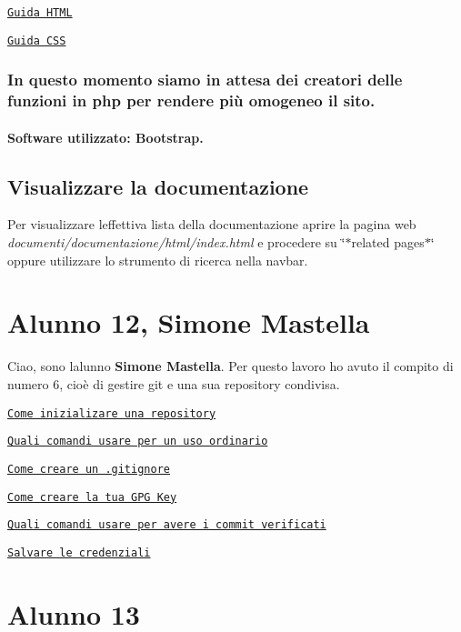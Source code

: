 \href{https://www.w3schools.com/html/}{\tt Guida H\+T\+ML}

\href{https://www.w3schools.com/css/}{\tt Guida C\+SS}

\subsubsection*{In questo momento siamo in attesa dei creatori delle funzioni in php per rendere più omogeneo il sito.}

\paragraph*{Software utilizzato\+: Bootstrap.}

\subsection*{Visualizzare la documentazione}

Per visualizzare l\textquotesingle{}effettiva lista della documentazione aprire la pagina web {\itshape documenti/documentazione/html/index.\+html} e procedere su \char`\"{}$\ast$related pages$\ast$\char`\"{} oppure utilizzare lo strumento di ricerca nella navbar.

\section*{Alunno 12, Simone Mastella}

Ciao, sono l\textquotesingle{}alunno {\bfseries Simone Mastella}. Per questo lavoro ho avuto il compito di numero 6, cioè di gestire git e una sua repository condivisa.

\href{https://gist.github.com/simonemastella/1792e8dd3cc8a8878825a4d2df676300}{\tt Come inizializare una repository}

\href{https://gist.github.com/simonemastella/90364ec267d65a5328bd97c23aee1864}{\tt Quali comandi usare per un uso ordinario}

\href{https://gist.github.com/simonemastella/e69cd0a0d9fe151e52c0fc53ac4ad3ea}{\tt Come creare un .gitignore}

\href{https://gist.github.com/simonemastella/2ad4f08ed6f18af7e102a8e1a573dd8d}{\tt Come creare la tua G\+PG Key}

\href{https://gist.github.com/simonemastella/3e763531b32e1db583e2dcb4fdd668a8}{\tt Quali comandi usare per avere i commit verificati}

\href{https://gist.github.com/simonemastella/ecd089c6106a961eb9272a40c5b16d5a}{\tt Salvare le credenziali} \section*{Alunno 13}


